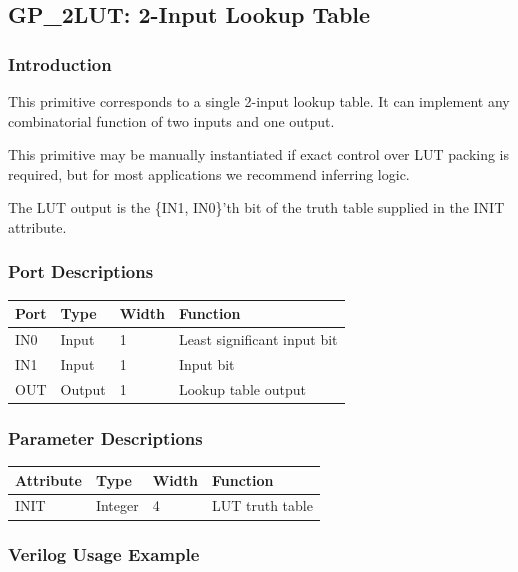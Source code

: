 \documentclass{article}
\begin{document}

\pagebreak
\subsection{GP\_2LUT: 2-Input Lookup Table}

\subsubsection{Introduction}
This primitive corresponds to a single 2-input lookup table. It can implement any combinatorial function of two 
inputs and one output.

This primitive may be manually instantiated if exact control over LUT packing is required, but for most applications we 
recommend inferring logic.

The LUT output is the \{IN1, IN0\}'th bit of the truth table supplied in the INIT attribute.

\subsubsection{Port Descriptions}

\begin{tabularx}{4in}{|l|l|l|X|}
\hline
{\bfseries Port} & {\bfseries Type} & {\bfseries Width} & {\bfseries Function} \\
\hline
IN0 & Input & 1 & Least significant input bit \\
\hline
IN1 & Input & 1 & Input bit \\
\hline
OUT & Output & 1 & Lookup table output \\
\hline
\end{tabularx}

\subsubsection{Parameter Descriptions}

\begin{tabularx}{4in}{|l|l|l|X|}
\hline
{\bfseries Attribute} & {\bfseries Type} & {\bfseries Width} & {\bfseries Function} \\
\hline
INIT & Integer & 4 & LUT truth table \\
\hline
\end{tabularx}

\subsubsection{Verilog Usage Example}
\end{document}
